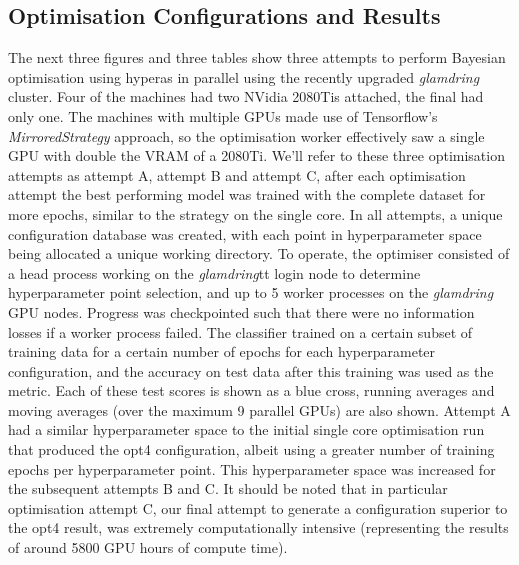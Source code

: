 \subsection{Optimisation Configurations and Results}
The next three figures and three tables show three attempts to perform Bayesian optimisation using hyperas in parallel using the recently upgraded \textit{glamdring} cluster. Four of the machines had two NVidia 2080Tis attached, the final had only one. The machines with multiple GPUs made use of Tensorflow's \textit{MirroredStrategy} approach, so the optimisation worker effectively saw a single GPU with double the VRAM of a 2080Ti. We'll refer to these three optimisation attempts as attempt A, attempt B and attempt C, after each optimisation attempt the best performing model was trained with the complete dataset for more epochs, similar to the strategy on the single core. In all attempts, a unique configuration database was created, with each point in hyperparameter space being allocated a unique working directory. To operate, the optimiser consisted of a head process working on the \textit{glamdring}tt login node to determine hyperparameter point selection, and up to 5 worker processes on the \textit{glamdring} GPU nodes. Progress was checkpointed such that there were no information losses if a worker process failed. The classifier trained on a certain subset of training data for a certain number of epochs for each hyperparameter configuration, and the accuracy on test data after this training was used as the metric. Each of these test scores is shown as a blue cross, running averages and moving averages (over the maximum 9 parallel GPUs) are also shown. Attempt A had a similar hyperparameter space to the initial single core optimisation run that produced the opt4 configuration, albeit using a greater number of training epochs per hyperparameter point. This hyperparameter space was increased for the subsequent attempts B and C. It should be noted that in particular optimisation attempt C, our final attempt to generate a configuration superior to the opt4 result, was extremely computationally intensive (representing the results of around 5800 GPU hours of compute time).

